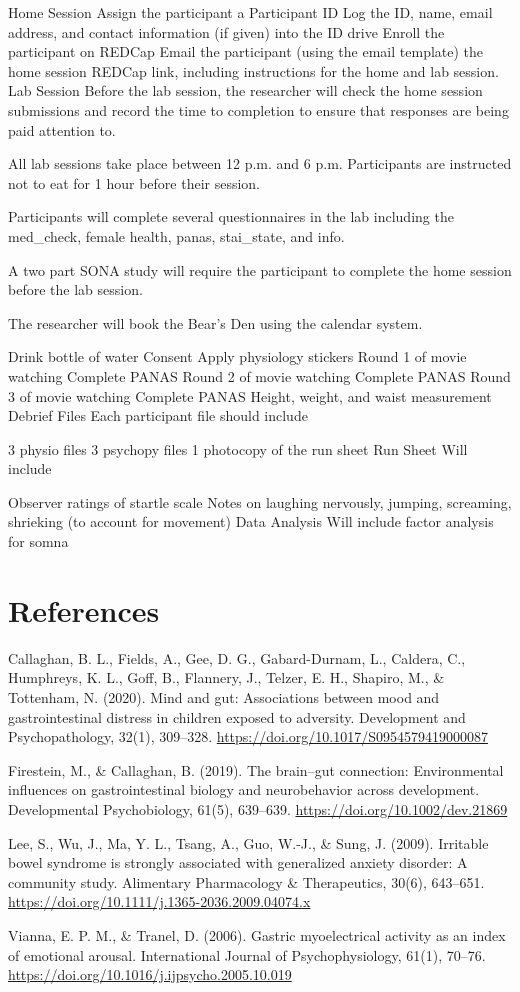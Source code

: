 \documentclass[]{book}
\begin{document}
Home Session
Assign the participant a Participant ID
Log the ID, name, email address, and contact information (if given) into the ID drive
Enroll the participant on REDCap
Email the participant (using the email template) the home session REDCap link, including instructions for the home and lab session.
Lab Session
Before the lab session, the researcher will check the home session submissions and record the time to completion to ensure that responses are being paid attention to.

All lab sessions take place between 12 p.m. and 6 p.m. Participants are instructed not to eat for 1 hour before their session.

Participants will complete several questionnaires in the lab including the med\_check, female health, panas, stai\_state, and info.

A two part SONA study will require the participant to complete the home session before the lab session.

The researcher will book the Bear's Den using the calendar system.

Drink bottle of water
Consent
Apply physiology stickers
Round 1 of movie watching
Complete PANAS
Round 2 of movie watching
Complete PANAS
Round 3 of movie watching
Complete PANAS
Height, weight, and waist measurement
Debrief
Files
Each participant file should include

3 physio files
3 psychopy files
1 photocopy of the run sheet
Run Sheet
Will include

Observer ratings of startle scale
Notes on laughing nervously, jumping, screaming, shrieking (to account for movement)
Data Analysis
Will include factor analysis for somna

\hypertarget{references}{%
\chapter{References}\label{references}}

Callaghan, B. L., Fields, A., Gee, D. G., Gabard-Durnam, L., Caldera, C., Humphreys, K. L., Goff, B., Flannery, J., Telzer, E. H., Shapiro, M., \& Tottenham, N. (2020). Mind and gut: Associations between mood and gastrointestinal distress in children exposed to adversity. Development and Psychopathology, 32(1), 309--328. \url{https://doi.org/10.1017/S0954579419000087}

Firestein, M., \& Callaghan, B. (2019). The brain--gut connection: Environmental influences on gastrointestinal biology and neurobehavior across development. Developmental Psychobiology, 61(5), 639--639. \url{https://doi.org/10.1002/dev.21869}

Lee, S., Wu, J., Ma, Y. L., Tsang, A., Guo, W.-J., \& Sung, J. (2009). Irritable bowel syndrome is strongly associated with generalized anxiety disorder: A community study. Alimentary Pharmacology \& Therapeutics, 30(6), 643--651. \url{https://doi.org/10.1111/j.1365-2036.2009.04074.x}

Vianna, E. P. M., \& Tranel, D. (2006). Gastric myoelectrical activity as an index of emotional arousal. International Journal of Psychophysiology, 61(1), 70--76. \url{https://doi.org/10.1016/j.ijpsycho.2005.10.019}
\end{document}

